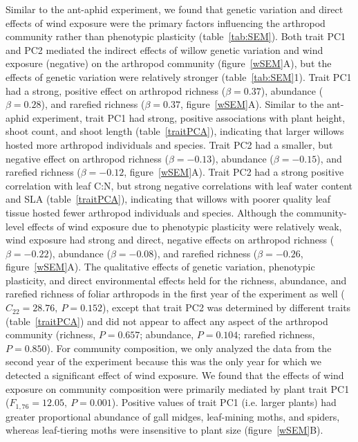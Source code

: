 \documentclass[11pt]{article}
\begin{document}
Similar to the ant-aphid experiment, we found that genetic
variation and direct effects of wind exposure were the primary factors
influencing the arthropod community rather than phenotypic plasticity
(table~\ref{tab:SEM}). Both trait PC1 and PC2 mediated the indirect effects of
willow genetic variation and wind exposure (negative) on the arthropod
community (figure~\ref{wSEM}A), but the effects of genetic variation were
relatively stronger (table~\ref{tab:SEM}1). Trait PC1 had a strong, positive effect
on arthropod richness ($\beta = 0.37$), abundance ($\beta =
0.28$), and rarefied richness ($\beta = 0.37$, figure~\ref{wSEM}A). Similar to the
ant-aphid experiment, trait PC1 had strong, positive associations with
plant height, shoot count, and shoot length (table~\ref{traitPCA}), indicating that
larger willows hosted more arthropod individuals and species. Trait PC2 had a smaller,
but negative effect on arthropod richness ($\beta = -0.13$),
abundance ($\beta = -0.15$), and rarefied richness ($\beta =
-0.12$, figure~\ref{wSEM}A). Trait PC2 had a strong positive correlation with leaf
C:N, but strong negative correlations with leaf water content and SLA
(table~\ref{traitPCA}), indicating that willows with poorer quality leaf tissue
hosted fewer arthropod individuals and species. Although the community-level effects of
wind exposure due to phenotypic plasticity were relatively weak, wind
exposure had strong and direct, negative effects on arthropod richness
($\beta = -0.22$), abundance ($\beta = -0.08$), and rarefied
richness ($\beta = -0.26$, figure~\ref{wSEM}A). The qualitative effects of
genetic variation, phenotypic plasticity, and direct
environmental effects held for the richness, abundance, and rarefied
richness of foliar arthropods in the first year of the experiment as
well (\(C_{22}=28.76,\ P=0.152\)), except that trait PC2 was determined by
different traits (table~\ref{traitPCA}) and did not appear to affect any aspect of
the arthropod community (richness, \(P=0.657\); abundance,
\(P=0.104\); rarefied richness, \(P=0.850\)). For community
composition, we only analyzed the data from the second year of the
experiment because this was the only year for which we detected a
significant effect of wind exposure. We found that the effects of wind
exposure on community composition were primarily mediated by plant trait
PC1 (\(F_{1,76}=12.05,\ P=0.001\)). Positive values of trait PC1 (i.e. larger
plants) had greater proportional abundance of gall midges, leaf-mining
moths, and spiders, whereas leaf-tiering moths were insensitive to plant
size (figure~\ref{wSEM}B).
\end{document}
